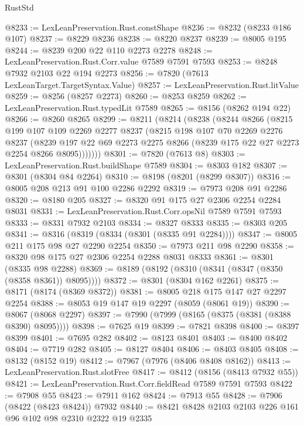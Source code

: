 \begin{lexlean}{RustStd}
\begin{coremodule}
{\begin{coremodule}
{{{{{{{{{{{{{{{{{{{{{{{{{{{{{{{{{{@8233 := LexLeanPreservation.Rust.constShape
@8236 := @8232 (@8233 @186 @107)
@8237 := @8229 @8236
@8238 := @8220 @8237
@8239 := @8005 @195
@8244 := @8239 @200 @22 @110 @2273 @2278
@8248 := LexLeanPreservation.Rust.Corr.value @7589 @7591 @7593
@8253 := @8248 @7932 @2103 @22 @194 @2273
@8256 := @7820 (@7613 LexLeanTarget.TargetSyntax.Value)
@8257 := LexLeanPreservation.Rust.litValue
@8259 := @8256 (@8257 @2273)
@8260 := @8253 @8259
@8262 := LexLeanPreservation.Rust.typedLit @7589
@8265 := @8156 (@8262 @194 @22)
@8266 := @8260 @8265
@8299 := @8211
    (@8214
      (@8238
        (@8244
          @8266
          (@8215
            @199
            @107
            @109
            @2269
            @2277
            @8237
            (@8215
              @198
              @107
              @70
              @2269
              @2276
              @8237
              (@8239
                @197
                @22
                @69
                @2273
                @2275
                @8266
                (@8239 @175 @22 @27 @2273 @2254 @8266 @8095)))))))
@8301 := @7820 (@7613 @8)
@8303 := LexLeanPreservation.Rust.buildShape @7589
@8304 := @8303 @182
@8307 := @8301 (@8304 @84 @2264)
@8310 := @8198 (@8201 (@8299 @8307))
@8316 := @8005 @208 @213 @91 @100 @2286 @2292
@8319 := @7973 @208 @91 @2286
@8320 := @8180 @205
@8327 := @8320 @91 @175 @27 @2306 @2254 @2284 @8031
@8331 := LexLeanPreservation.Rust.Corr.opsNil @7589 @7591 @7593
@8333 := @8331 @7932 @2103
@8334 := @8327 @8333
@8335 := @8303 @205
@8341 := @8316 (@8319 (@8334 (@8301 (@8335 @91 @2284))))
@8347 := @8005 @211 @175 @98 @27 @2290 @2254
@8350 := @7973 @211 @98 @2290
@8358 := @8320 @98 @175 @27 @2306 @2254 @2288 @8031 @8333
@8361 := @8301 (@8335 @98 @2288)
@8369 := @8189 (@8192 (@8310 (@8341 (@8347 (@8350 (@8358 @8361)) @8095))))
@8372 := @8301 (@8304 @162 @2261)
@8375 := @8171 (@8174 (@8369 @8372))
@8381 := @8005 @218 @175 @147 @27 @2297 @2254
@8388 := @8053 @19 @147 @19 @2297 (@8059 (@8061 @19))
@8390 := @8067 (@8068 @2297)
@8397 := @7990 (@7999 (@8165 (@8375 (@8381 (@8388 @8390) @8095))))
@8398 := @7625 @19
@8399 := @7821 @8398
@8400 := @8397 @8399
@8401 := @7695 @282
@8402 := @8123 @8401
@8403 := @8400 @8402
@8404 := @7719 @282
@8405 := @8127 @8404
@8406 := @8403 @8405
@8408 := @8132 (@8152 @19)
@8412 := @7967 (@7976 (@8406 @8408 @8162))
@8413 := LexLeanPreservation.Rust.slotFree
@8417 := @8412 (@8156 (@8413 @7932 @55))
@8421 := LexLeanPreservation.Rust.Corr.fieldRead @7589 @7591 @7593
@8422 := @7908 @55
@8423 := @7911 @162
@8424 := @7913 @55
@8428 := @7906 (@8422 (@8423 @8424)) @7932
@8440 := @8421 @8428 @2103 @2103 @226 @161 @96 @102 @98 @2310 @2322 @19 @2335
}}}}}}}}}}}}}}}}}}}}}}}}}}}}}}}}}}
\end{coremodule}}
\end{coremodule}
\end{lexlean}
